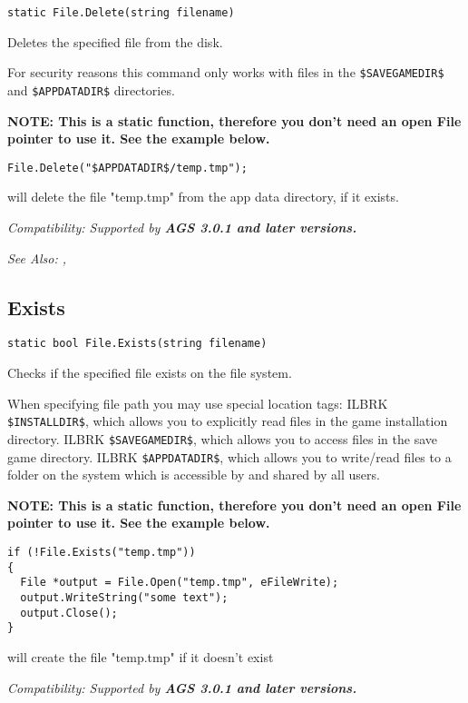 \begin{verbatim}
static File.Delete(string filename)
\end{verbatim}
Deletes the specified file from the disk.

For security reasons this command only works with files in the \verb^$SAVEGAMEDIR$^ and \verb^$APPDATADIR$^ directories.

\bf{NOTE:} This is a static function, therefore you don't need an open File pointer
to use it. See the example below.

\begin{verbatim}
File.Delete("$APPDATADIR$/temp.tmp");
\end{verbatim}
will delete the file "temp.tmp" from the app data directory, if it exists.

\it{Compatibility:} Supported by \bf{AGS 3.0.1} and later versions.

\it{See Also:} , 


\subsection{Exists}\label{File.Exists}%

\begin{verbatim}
static bool File.Exists(string filename)
\end{verbatim}
Checks if the specified file exists on the file system.

When specifying file path you may use special location tags: ILBRK
\verb^$INSTALLDIR$^, which allows you to explicitly read files in the game installation directory. ILBRK
\verb^$SAVEGAMEDIR$^, which allows you to access files in the save game directory. ILBRK
\verb^$APPDATADIR$^, which allows you to write/read files to a folder on the system which
is accessible by and shared by all users.

\bf{NOTE:} This is a static function, therefore you don't need an open File pointer
to use it. See the example below.

\begin{verbatim}
if (!File.Exists("temp.tmp"))
{
  File *output = File.Open("temp.tmp", eFileWrite);
  output.WriteString("some text");
  output.Close();
}
\end{verbatim}
will create the file "temp.tmp" if it doesn't exist

\it{Compatibility:} Supported by \bf{AGS 3.0.1} and later versions.

